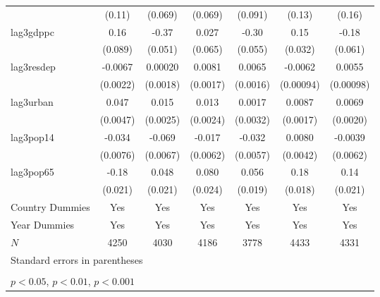 \begin{table}[htbp]
\begin{tabular}{l*{6}{c}}
            &      (0.11)         &     (0.069)         &     (0.069)         &     (0.091)         &      (0.13)         &      (0.16)         \\
[1em]
lag3gdppc   &        0.16         &       -0.37\sym{***}&       0.027         &       -0.30\sym{***}&        0.15\sym{***}&       -0.18\sym{**} \\
            &     (0.089)         &     (0.051)         &     (0.065)         &     (0.055)         &     (0.032)         &     (0.061)         \\
[1em]
lag3resdep  &     -0.0067\sym{**} &     0.00020         &      0.0081\sym{***}&      0.0065\sym{***}&     -0.0062\sym{***}&      0.0055\sym{***}\\
            &    (0.0022)         &    (0.0018)         &    (0.0017)         &    (0.0016)         &   (0.00094)         &   (0.00098)         \\
[1em]
lag3urban   &       0.047\sym{***}&       0.015\sym{***}&       0.013\sym{***}&      0.0017         &      0.0087\sym{***}&      0.0069\sym{***}\\
            &    (0.0047)         &    (0.0025)         &    (0.0024)         &    (0.0032)         &    (0.0017)         &    (0.0020)         \\
[1em]
lag3pop14   &      -0.034\sym{***}&      -0.069\sym{***}&      -0.017\sym{**} &      -0.032\sym{***}&      0.0080         &     -0.0039         \\
            &    (0.0076)         &    (0.0067)         &    (0.0062)         &    (0.0057)         &    (0.0042)         &    (0.0062)         \\
[1em]
lag3pop65   &       -0.18\sym{***}&       0.048\sym{*}  &       0.080\sym{**} &       0.056\sym{**} &        0.18\sym{***}&        0.14\sym{***}\\
            &     (0.021)         &     (0.021)         &     (0.024)         &     (0.019)         &     (0.018)         &     (0.021)         \\
[1em]
Country Dummies &         Yes         &         Yes         &         Yes         &         Yes         &         Yes         &         Yes         \\
[1em]
Year Dummies &         Yes         &         Yes         &         Yes         &         Yes         &         Yes         &         Yes         \\
\hline
\(N\)       &        4250         &        4030         &        4186         &        3778         &        4433         &        4331         \\
\hline\hline
\multicolumn{7}{l}{\footnotesize Standard errors in parentheses}\\
 & & & & & & \\
\multicolumn{7}{l}{\footnotesize \sym{*} \(p<0.05\), \sym{**} \(p<0.01\), \sym{***} \(p<0.001\)}\\
\end{tabular}
\end{table}
